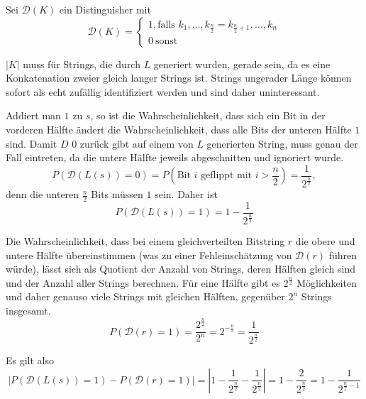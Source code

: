 \documentclass{../crypto}
\begin{document}
Sei $\mathcal{D}(K)$ ein Distinguisher mit 
\begin{equation*}
   \mathcal{D}(K) = 
   \begin{cases}
      1, \text{falls $k_1,\ldots,k_{\frac{n}{2}} = k_{\frac{n}{2} + 1},\ldots,k_n$} \\
      0\ \text{sonst}
   \end{cases}
\end{equation*}

$|K|$ muss für Strings, die durch $L$ generiert wurden, gerade sein, da es
eine Konkatenation zweier gleich langer Strings ist. Strings ungerader Länge
können sofort als echt zufällig identifiziert werden und sind daher
uninteressant.

Addiert man $1$ zu $s$, so ist die Wahrscheinlichkeit, dass sich ein Bit in der
vorderen Hälfte ändert die Wahrscheinlichkeit, dass alle Bits der unteren Hälfte
$1$ sind. Damit $D$ $0$ zurück gibt auf einem von $L$ generierten String, muss
genau der Fall eintreten, da die untere Hälfte jeweils abgeschnitten und
ignoriert wurde.
\begin{equation*}
   P(\mathcal{D}(L(s)) = 0) = P(\text{Bit $i$ geflippt mit $i>\frac{n}{2}$}) = \frac{1}{2^{\frac{n}{2}}},
\end{equation*}
denn die unteren $\frac{n}{2}$ Bits müssen $1$ sein.
Daher ist 
\begin{equation*}
   P(\mathcal{D}(L(s)) = 1) = 1 - \frac{1}{2^\frac{n}{2}}
\end{equation*}

Die Wahrscheinlichkeit, dass bei einem gleichverteilten Bitstring $r$ die obere
und untere Hälfte übereinstimmen (was zu einer Fehleinschätzung von $\mathcal{D}(r)$
führen würde), lässt sich als Quotient der Anzahl von Strings, deren Hälften
gleich sind und der Anzahl aller Strings berechnen. Für eine Hälfte gibt es
$2^{\frac{n}{2}}$ Möglichkeiten und daher genauso viele Strings mit gleichen
Hälften, gegenüber $2^n$ Strings insgesamt.
\begin{equation*}
   P(\mathcal{D}(r) = 1) = \frac{2^{\frac{n}{2}}}{2^n} = 2^{-\frac{n}{2}} = \frac{1}{2^\frac{n}{2}}
\end{equation*}

Es gilt also 
\begin{equation*}
   \left\lvert P(\mathcal{D}(L(s)) = 1) - P(\mathcal{D}(r) = 1) \right\rvert = \left\lvert1 - \frac{1}{2^\frac{n}{2}} -
   \frac{1}{2^\frac{n}{2}}\right\rvert = 1 - \frac{2}{2^{\frac{n}{2}}} = 1 -
   \frac{1}{2^{\frac{n}{2} - 1}}
\end{equation*}
\end{document}
